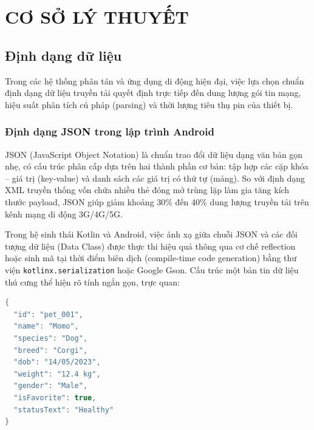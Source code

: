 \chapter{CƠ SỞ LÝ THUYẾT}
\label{chap:co_so_ly_thuyet}

\section{Định dạng dữ liệu}
\label{sec:dinh_dang_du_lieu}

Trong các hệ thống phân tán và ứng dụng di động hiện đại, việc lựa chọn chuẩn định dạng dữ liệu truyền tải quyết định trực tiếp đến dung lượng gói tin mạng, hiệu suất phân tích cú pháp (parsing) và thời lượng tiêu thụ pin của thiết bị.

\subsection{Định dạng JSON trong lập trình Android}
\label{subsec:dinh_dang_json}

JSON (JavaScript Object Notation) là chuẩn trao đổi dữ liệu dạng văn bản gọn nhẹ, có cấu trúc phân cấp dựa trên hai thành phần cơ bản: tập hợp các cặp khóa -- giá trị (key-value) và danh sách các giá trị có thứ tự (mảng). So với định dạng XML truyền thống vốn chứa nhiều thẻ đóng mở trùng lặp làm gia tăng kích thước payload, JSON giúp giảm khoảng 30\% đến 40\% dung lượng truyền tải trên kênh mạng di động 3G/4G/5G.

Trong hệ sinh thái Kotlin và Android, việc ánh xạ giữa chuỗi JSON và các đối tượng dữ liệu (Data Class) được thực thi hiệu quả thông qua cơ chế reflection hoặc sinh mã tại thời điểm biên dịch (compile-time code generation) bằng thư viện \texttt{kotlinx.serialization} hoặc Google Gson. Cấu trúc một bản tin dữ liệu thú cưng thể hiện rõ tính ngắn gọn, trực quan:

\begin{lstlisting}[language=Java, caption={Ví dụ cấu trúc JSON ánh xạ đối tượng PetModel}, label={lst:json_example}]
{
  "id": "pet_001",
  "name": "Momo",
  "species": "Dog",
  "breed": "Corgi",
  "dob": "14/05/2023",
  "weight": "12.4 kg",
  "gender": "Male",
  "isFavorite": true,
  "statusText": "Healthy"
}
\end{lstlisting}

